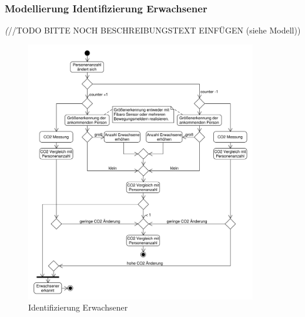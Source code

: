 \subsubsection{Modellierung Identifizierung Erwachsener}
\emph(//TODO BITTE NOCH BESCHREIBUNGSTEXT EINFÜGEN (siehe Modell))
\begin{figure}[h!]
	\centering
	\includegraphics[width=0.9\textwidth]{img/Szenarien/IdentifizierungErwachsene.pdf}
	\caption{Identifizierung Erwachsener}
	\label{fig:szenarienIdentifizierungErwachsene}
\end{figure}

